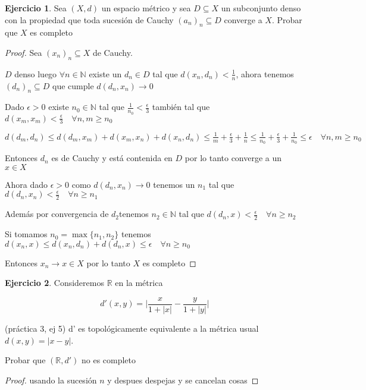 \documentclass[12pt]{article}
\newcommand{\R}{\mathbb{R}}
\newcommand{\N}{\mathbb{N}}
\newcommand{\ra}{\rightarrow}
\theoremstyle{definition}
\newtheorem{ej}{Ejercicio}
\begin{document}
\begin{ej}
	Sea $(X,d)$ un espacio métrico y sea $D \subseteq X$ un subconjunto denso con la propiedad que toda sucesión de Cauchy $(a_n)_n \subseteq D$ converge a $X$. Probar que $X$ es completo 
	\begin{proof}
		Sea $(x_n)_n \subseteq X$ de Cauchy. 

		$D$ denso luego $\forall n \in \N$ existe un $d_n \in D$ tal que $d(x_n,d_n) < \frac{1}{n}$, ahora tenemos $(d_n)_n \subseteq D$ que cumple $d(d_n,x_n) \ra 0$

		Dado $\epsilon > 0$ existe $n_0 \in \N$ tal que $\frac{1}{n_0} < \frac{\epsilon}{3}$ también tal que $d(x_m,x_m) < \frac{\epsilon}{3} \quad \forall n,m \geq n_0$

		$d(d_m,d_n) \leq d(d_m,x_m) + d(x_m, x_n) + d(x_n, d_n) \leq \frac{1}{m} + \frac{\epsilon}{3} + \frac{1}{n} \leq \frac{1}{n_0} + \frac{\epsilon}{3} + \frac{1}{n_0} \leq \epsilon \quad \forall n,m \geq n_0$

		Entonces $d_n$ es de Cauchy y está contenida en $D$ por lo tanto converge a un  $x \in X$

		Ahora dado $\epsilon > 0$ como $d(d_n,x_n) \ra 0$ tenemos un $n_1$ tal que $d(d_n,x_n) < \frac{\epsilon}{2} \quad \forall n \geq n_1$ 

		Además por convergencia de $d_2$tenemos $n_2 \in \N$ tal que $d(d_n,x) < \frac{\epsilon}{2} \quad \forall n \geq n_2$

		Si tomamos $n_0 = \max\{n_1,n_2\}$ tenemos $d(x_n,x) \leq d(x_n,d_n) + d(d_n,x) \leq \epsilon \quad \forall n \geq n_0$

		Entonces $x_n \ra x \in X$ por lo tanto $X$ es completo

	\end{proof}
\end{ej}
\begin{ej}
Consideremos $\R$ en la métrica

	$$ d'(x,y) = \biggl |\frac{x}{1 + |x|} - \frac{y}{1 + |y|}\biggl |$$

	
\noindent (práctica 3, ej 5) d' es topológicamente equivalente a la métrica usual $d(x,y) = |x - y|$.
	
	Probar que $(\R,d')$ no es completo
	\begin{proof}
usando la sucesión $n$ y despues despejas y se cancelan cosas
	\end{proof}
\end{ej}
\end{document}
